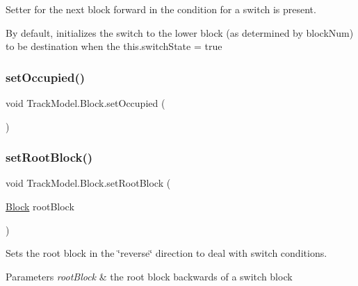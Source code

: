 Setter for the next block forward in the condition for a switch is present. 

By default, initializes the switch to the lower block (as determined by block\+Num) to be destination when the this.\+switch\+State = true \mbox{\label{classTrackModel_1_1Block_a5a3c1477275fe3e3c7d0aaf4d7c32449}} 
\subsubsection{\texorpdfstring{set\+Occupied()}{setOccupied()}}
{\footnotesize\ttfamily void Track\+Model.\+Block.\+set\+Occupied (\begin{DoxyParamCaption}{ }\end{DoxyParamCaption})}

\mbox{\label{classTrackModel_1_1Block_a07ebf377b8be2509705a1fbb5e48e98b}} 
\subsubsection{\texorpdfstring{set\+Root\+Block()}{setRootBlock()}}
{\footnotesize\ttfamily void Track\+Model.\+Block.\+set\+Root\+Block (\begin{DoxyParamCaption}\item[{\hyperlink{classTrackModel_1_1Block}{Block}}]{root\+Block }\end{DoxyParamCaption})}



Sets the root block in the \char`\"{}reverse\char`\"{} direction to deal with switch conditions. 


\begin{DoxyParams}{Parameters}
{\em root\+Block} & the root block backwards of a switch block \\
\hline
\end{DoxyParams}
\mbox{\label{classTrackModel_1_1Block_aa206833e61700249e5905fe6e6126399}} 
